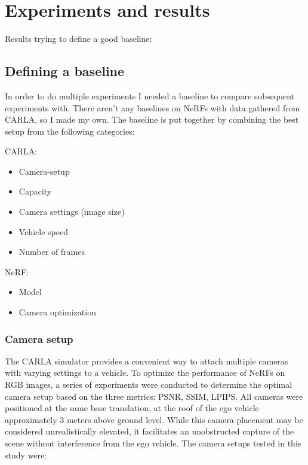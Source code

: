 \chapter{Experiments and results} \label{sec:experiments-and-results}
Results trying to define a good baseline:


\section{Defining a baseline}
In order to do multiple experiments I needed a baseline to compare subsequent experiments with. There aren't any baselines on NeRFs with data gathered from CARLA, so I made my own. The baseline is put together by combining the best setup from the following categories:

CARLA:
\begin{itemize}
    \item Camera-setup
    \item Capacity
    \item Camera settings (image size)
    \item Vehicle speed
    \item Number of frames
\end{itemize}

NeRF:
\begin{itemize}
    \item Model
    \item Camera optimization
\end{itemize}













\subsection{Camera setup} \label{sec:exp-camera-setup}
The CARLA simulator provides a convenient way to attach multiple cameras with varying settings to a vehicle. To optimize the performance of NeRFs on RGB images, a series of experiments were conducted to determine the optimal camera setup based on the three metrics: PSNR, SSIM, LPIPS. All cameras were positioned at the same base translation, at the roof of the ego vehicle approximately 3 meters above ground level. While this camera placement may be considered unrealistically elevated, it facilitates an unobstructed capture of the scene without interference from the ego vehicle. The camera setups tested in this study were:

